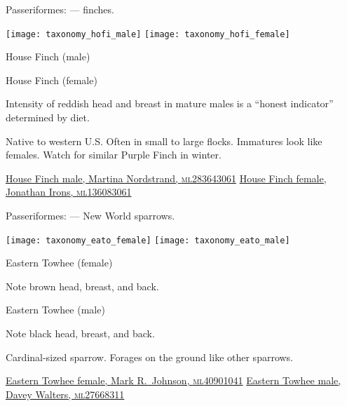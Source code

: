\documentclass[t]{beamer}
\newcommand{\backoneline}{\vspace{-\baselineskip}}
\begin{document}
%

\begin{frame}{Passeriformes:  — finches.}
	
	\texttt{[image: taxonomy\_hofi\_male]}\hfill
	\texttt{[image: taxonomy\_hofi\_female]}
	
	\backoneline
	
	\begin{multicols}{2}
		House Finch (male)
		
		\columnbreak
		
		House Finch (female)
		
	\end{multicols}	
	
	Intensity of reddish head and breast in mature males is a “honest indicator” determined by diet.
	
	\medskip
	
	Native to western U.S. Often in small to large flocks. Immatures look like females. Watch for similar Purple Finch in winter.
	
	\vfilll
	
	\tiny
	
	\href{https://macaulaylibrary.org/asset/283643061}{House Finch male, Martina Nordstrand, \textsc{ml}283643061} \hfill 
	\href{https://macaulaylibrary.org/asset/136083061}{House Finch female, Jonathan Irons, \textsc{ml}136083061}
	
\end{frame}

%

\begin{frame}{Passeriformes:  — New World sparrows.}
	
		\texttt{[image: taxonomy\_eato\_female]}\hfill
		\texttt{[image: taxonomy\_eato\_male]}
	
		\backoneline
		
		\begin{multicols}{2}
				Eastern Towhee (female)
				
				\medskip
				
				Note brown head, breast, and back.
				
				\columnbreak
				
				Eastern Towhee (male)
				
				\medskip
				
				Note black head, breast, and back.
				
			\end{multicols}	
		
		Cardinal-sized sparrow. Forages on the ground like other sparrows.
		
		\vfilll
		
		\tiny
		
		\href{https://macaulaylibrary.org/asset/40901041}{Eastern Towhee female, Mark R.~Johnson, \textsc{ml}40901041} \hfill 
		\href{https://macaulaylibrary.org/asset/27668311}{Eastern Towhee male, Davey Walters, \textsc{ml}27668311}
	
\end{frame}
\end{document}
